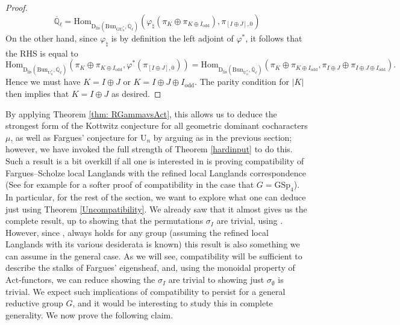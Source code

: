\documentclass[reqno,11pt]{amsart}
\theoremstyle{remark}
\newcommand{\GU}{\mathrm{GU}}
\newcommand{\U}{\mathrm{U}}
\newcommand{\Act}{\mathrm{Act}}
\newcommand{\Bun}{\mathrm{Bun}}
\newcommand{\Dlis}{\mathrm{D}_{\mathrm{lis}}}
\newcommand{\odd}{\mathrm{odd}}
\def\ol{\overline}
\begin{document}
\begin{proof}
\[ \ol{\mathbb{Q}}_{\ell} = \mathrm{Hom}_{\Dlis(\Bun_{\GU^*_{n}},\ol{\mathbb{Q}}_{\ell})}(\varphi_{\natural}(\pi_{K} \oplus \pi_{K \oplus I_{\mathrm{odd}}}),\pi_{[I \oplus J],0}) \]
On the other hand, since $\varphi_{\natural}$ is by definition the left adjoint of $\varphi^{*}$, it follows that the RHS is equal to
\[ \mathrm{Hom}_{\Dlis(\Bun_{\U^*_{n}},\ol{\mathbb{Q}}_{\ell})}(\pi_{K} \oplus \pi_{K \oplus I_{\mathrm{odd}}},\varphi^{*}(\pi_{[I \oplus J],0})) = \mathrm{Hom}_{\Dlis(\Bun_{\U^*_{n}},\ol{\mathbb{Q}}_{\ell})}(\pi_{K} \oplus \pi_{K \oplus I_{\mathrm{odd}}},\pi_{I \oplus J} \oplus \pi_{I \oplus J \oplus I_{\mathrm{odd}}}). \]
Hence we must have $K= I \oplus J$ or $K = I \oplus J \oplus I_{\odd}$. The parity condition for $|K|$ then implies that $K= I \oplus J$ as desired.
\end{proof}
By applying Theorem \ref{thm: RGammavsAct}, this allows us to deduce the strongest form of the Kottwitz conjecture for all geometric dominant cocharacters $\mu$, as well as Fargues' conjecture for $\U_{n}$ by arguing as in the previous section; however, we have invoked the full strength of Theorem \ref{hardinput} to do this. Such a result is a bit overkill if all one is interested in is proving compatibility of Fargues--Scholze local Langlands with the refined local Langlands correspondence (See for example \cite{Ham} for a softer proof of compatibility in the case that $G = \mathrm{GSp}_{4}$). In particular, for the rest of the section, we want to explore what one can deduce just using Theorem \ref{Uncompatibility}. We already saw that it almost gives us the complete result, up to showing that the permutations $\sigma_{I}$ are trivial, using \cite[Theorem~1.0.2]{HKW}. However, since \cite[Theorem~1.0.2]{HKW}, always holds for any group (assuming the refined local Langlands with its various desiderata is known) this result is also something we can assume in the general case.  As we will see, compatibility will be sufficient to describe the stalks of Fargues' eigensheaf, and, using the monoidal property of $\Act$-functors, we can reduce showing the $\sigma_{I}$ are trivial to showing just $\sigma_{\emptyset}$ is trivial. We expect such implications of compatibility to persist for a general reductive group $G$, and it would be interesting to study this in complete generality. We now prove the following claim. 
\end{document}
